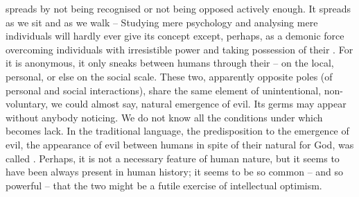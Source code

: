  spreads by not being recognised or not being opposed
actively enough. It spreads as we sit and as we walk --  Studying mere psychology and analysing mere individuals will 
hardly ever give its concept except, perhaps, as a demonic force overcoming
individuals with irresistible power and taking possession of their .
For it is anonymous, it only sneaks between humans through their
 -- on the local, personal, or else on the social scale.
These two, apparently opposite poles (of personal and social interactions),
share the same element of unintentional, non-voluntary, we could almost say,
natural emergence of evil.  Its
germs may appear without anybody noticing. We do not know all the conditions
under which  becomes lack.  In the traditional language, the
 predisposition to the emergence of evil, the appearance of evil
between humans in spite of their natural  for God, was called
.  Perhaps, it is not a necessary feature of human nature, but
it seems to have been always present in human history; it seems to be so common
-- and so powerful -- that  the two might be a futile exercise
of intellectual optimism.



